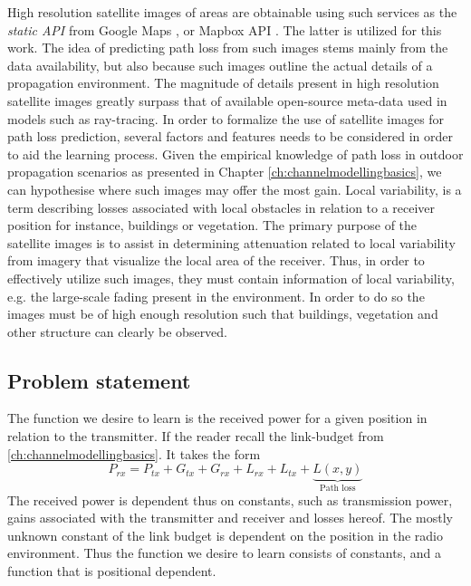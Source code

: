 High resolution satellite images of areas are obtainable using such services as the \emph{static API} from Google Maps \cite{GoogleAPI}, or Mapbox API \cite{MapboxWebsite}. The latter is utilized for this work. The idea of predicting path loss from such images stems mainly from the data availability, but also because such images outline the actual details of a propagation environment. The magnitude of details present in high resolution satellite images greatly surpass that of available open-source meta-data used in models such as ray-tracing. In order to formalize the use of satellite images for path loss prediction, several factors and features needs to be considered in order to aid the learning process. Given the empirical knowledge of path loss in outdoor propagation scenarios as presented in Chapter \ref{ch:channelmodellingbasics}, we can hypothesise where such images may offer the most gain. Local variability, is a term describing losses associated with local obstacles in relation to a receiver position for instance, buildings or vegetation. The primary purpose of the satellite images is to assist in determining attenuation related to local variability from imagery that visualize the local area of the receiver. Thus, in order to effectively utilize such images, they must contain information of local variability, e.g. the large-scale fading present in the environment. In order to do so the images must be of high enough resolution such that buildings, vegetation and other structure can clearly be observed.


\subsection{Problem statement}

The function we desire to learn is the received power for a given position in relation to the transmitter. If the reader recall the link-budget from \ref{ch:channelmodellingbasics}. It takes the form
\begin{equation}
    P_{rx} = P_{tx} + G_{tx} + G_{rx} + L_{rx} + L_{tx} + \underbrace{L(x,y)}_{\text{Path loss}}
\end{equation}
The received power is dependent thus on constants, such as transmission power, gains associated with the transmitter and receiver and losses hereof. The mostly unknown constant of the link budget is dependent on the position in the radio environment. Thus the function we desire to learn consists of constants, and a function that is positional dependent.  


